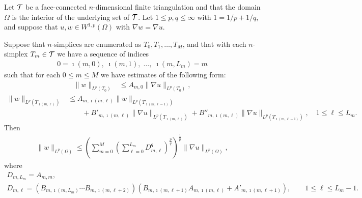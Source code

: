 \documentclass[10pt,a4paper]{article}
\begin{document}
\begin{theorem}\label{theorem:fullrecursivesum:grad}
    Let ${\mathcal T}$ be a face-connected $n$-dimensional finite triangulation
    and that the domain $\Omega$ is the interior of the underlying set of ${\mathcal T}$. 
    Let $1 \leq p,q \leq \infty$ with $1 = 1/p + 1/q$,
    and suppose that $u, w \in W^{1,p}(\Omega)$ with $\nabla w = \nabla u$.

    Suppose that $n$-simplices are enumerated as $T_0, T_1, \dots, T_M$,
    and that with each $n$-simplex $T_{m} \in {\mathcal T}$ 
    we have a sequence of indices 
    \begin{gather*}
        0 = \imath(m,0), \; \imath(m,1), \; \dots, \; \imath(m,L_m) = m
    \end{gather*}
    such that for each $0 \leq m \leq M$ we have estimates of the following form:
    \begin{align*}
        \| w \|_{L^{p}(T_{0})} &\leq A_{m,0} \| \nabla u \|_{L^{p}(T_{0})}
        ,
    \end{align*}
    \begin{align*}
        \| w \|_{ L^{p}(T_{\imath(m,\ell)}) }
        &\leq  
        A_{m,\imath(m,\ell)}
        \| w \|_{ L^{p}(T_{\imath(m,\ell-1)}) }
        \\&\qquad 
        +
        B'_{m,\imath(m,\ell)}
        \| \nabla u \|_{ L^{p}(T_{\imath(m,\ell)}) }
        + 
        B''_{m,\imath(m,\ell)}
        \| \nabla u \|_{ L^{p}(T_{\imath(m,\ell-1)}) }
        ,
        \quad 1 \leq \ell \leq L_m
        .
    \end{align*}
    Then 
    \begin{gather*}
        \| w \|_{ L^{p}(\Omega) }
        \leq 
        \left(
            \sum_{m=0}^{M}
            \left( \sum_{\ell=0}^{L_m} D_{m,\ell}^{q} \right)^{\frac p q}
        \right)^{\frac 1 p}
        \| \nabla u \|_{ L^{p}(\Omega) }
        ,
    \end{gather*}
    where 
    \begin{gather*}
        D_{m,L_m} = A_{m,m},
        \\
        D_{m,\ell} 
        = 
        \left( B_{m,\imath(m,L_m)} \cdots B_{m,\imath(m,\ell+2)} \right) 
        \left( B_{m,\imath(m,\ell+1)} A_{m,\imath(m,\ell)} + A'_{m,\imath(m,\ell+1)} \right) 
        ,
        \qquad 
        1 \leq \ell \leq L_{m}-1
        .
    \end{gather*}
\end{theorem}
\end{document}
